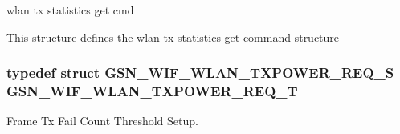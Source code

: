 wlan tx statistics get cmd 

This structure defines the wlan tx statistics get command structure \hypertarget{a00677_ga23625516479d19d7b54f0771fdacec4a}{
\subsubsection[{GSN\_\-WIF\_\-WLAN\_\-TXPOWER\_\-REQ\_\-T}]{\setlength{\rightskip}{0pt plus 5cm}typedef struct {\bf GSN\_\-WIF\_\-WLAN\_\-TXPOWER\_\-REQ\_\-S}  {\bf GSN\_\-WIF\_\-WLAN\_\-TXPOWER\_\-REQ\_\-T}}}
\label{a00677_ga23625516479d19d7b54f0771fdacec4a}


Frame Tx Fail Count Threshold Setup. 

